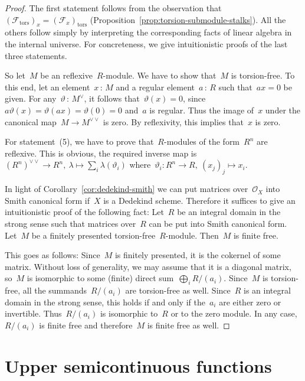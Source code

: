 \documentclass[10pt]{amsart}
\theoremstyle{definition}
\theoremstyle{plain}
\theoremstyle{remark}
\newcommand{\F}{\mathcal{F}}
\renewcommand{\O}{\mathcal{O}}
\newcommand{\tors}{\mathrm{tors}}
\newcommand{\?}{\,{:}\,}
\renewcommand{\_}{\mathpunct{.}\,}
\begin{document}
\begin{proof}The first statement follows from the observation that~$(\F_\tors)_x
= (\F_x)_\tors$ (Proposition~\ref{prop:torsion-submodule-stalks}). All the
others follow simply by interpreting the corresponding facts of linear algebra
in the internal universe. For concreteness, we give intuitionistic proofs of
the last three statements.

So let~$M$ be an reflexive~$R$-module. We have to show that~$M$ is
torsion-free. To this end, let an element~$x \? M$ and a regular element~$a \?
R$ such that~$ax = 0$ be given. For any~$\vartheta \? M^\vee$, it follows
that~$\vartheta(x) = 0$, since~$a \vartheta(x) = \vartheta(ax) = \vartheta(0) =
0$ and~$a$ is regular. Thus the image of~$x$ under the canonical map~$M \to
M^{\vee\vee}$ is zero. By reflexivity, this implies that~$x$ is zero.

For statement~(5), we have to prove that~$R$-modules of the form~$R^n$ are
reflexive. This is obvious, the required inverse map is~$(R^n)^{\vee\vee} \to
R^n,\ \lambda \mapsto \sum_i \lambda(\vartheta_i)$ where~$\vartheta_i : R^n \to
R,\ (x_j)_j \mapsto x_i$.

In light of Corollary~\ref{cor:dedekind-smith} we can put matrices over~$\O_X$
into Smith canonical form if~$X$ is a Dedekind scheme. Therefore it suffices
to give an intuitionistic proof of the following fact: Let~$R$ be an integral
domain in the strong sense such that matrices over~$R$ can be put into
Smith canonical form. Let~$M$ be a finitely presented torsion-free~$R$-module.
Then~$M$ is finite free.

This goes as follows: Since~$M$ is finitely presented, it is the cokernel of
some matrix. Without loss of generality, we may assume that it is a diagonal
matrix, so~$M$ is isomorphic to some (finite) direct sum~$\bigoplus_i R/(a_i)$.
Since~$M$ is torsion-free, all the summands~$R/(a_i)$ are torsion-free as well.
Since~$R$ is an integral domain in the strong sense, this holds if and only if
the~$a_i$ are either zero or invertible. Thus~$R/(a_i)$ is isomorphic to~$R$ or
to the zero module. In any case,~$R/(a_i)$ is finite free and therefore~$M$
is finite free as well.
\end{proof}


\section{Upper semicontinuous functions}
\label{sect:upper-semicontinuous-functions}
\end{document}
